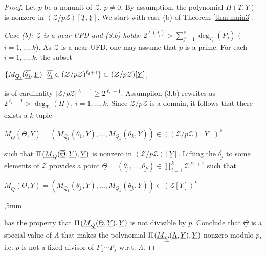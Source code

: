 \documentclass[10pt,a4paper]{amsart}
\begin{document}
\begin{proof} Let $p$ be a nonunit of ${\mathcal Z}$, $p\not=0$. By assumption, the polynomial $\Pi(\underline T,\underline Y)$ is nonzero in $({\mathcal Z}/p{\mathcal Z})[\underline T,\underline Y]$. We start with case (b) of Theorem \ref{thm:main3}.
\vskip 1mm

\noindent
\emph{Case {\rm (b)}: ${\mathcal Z}$ is a near UFD and {\rm (3.b)} holds: $2^{\ell({\underline d}_i)} > \sum_{j=1}^s \deg_{T_i}(P_j)$} ($i=1,\ldots,k$). As ${\mathcal Z}$ is a near UFD, one may assume that $p$ is a prime. For each $i=1,\ldots,k$, the subset
\vskip 2mm

\centerline{$\{M_{\underline {Q_i}}({\overline{\underline{\theta_i}}}, \underline Y) \hskip 2pt | \hskip 2pt \overline{\underline{\theta_i}} \in ({\mathcal Z}/p{\mathcal Z})^{\ell_i+1}\} \subset ({\mathcal Z}/p{\mathcal Z})[\underline Y]$,}
\vskip 2mm

\noindent
is of cardinality $|{\mathcal Z}/p{\mathcal Z}|^{\ell_i+1} \geq 2^{\ell_i+1}$. 
Assumpiion (3.b) rewrites as $2^{\ell_i+1}> \deg_{T_i}(\Pi)$, $i=1,\ldots,k$. Since ${\mathcal Z}/p{\mathcal Z}$ is a domain, it follows that there exists a $k$-tuple 
\vskip 1mm

\centerline{$\underline M_{\underline Q}( \overline{\underline{\Theta}},\underline Y)=(M_{\underline {Q_1}}({\overline{\underline{\theta_1}}}, \underline Y), \ldots, M_{\underline {Q_k}}({\overline{\underline{\theta_k}}}, \underline Y)) \in (({\mathcal Z}/p{\mathcal Z})[\underline Y])^k$}
\vskip 1mm

\noindent
such that
$\Pi\hskip 1pt (\underline M_{\underline Q}(\overline{\underline{\Theta}},\underline Y),\underline Y)$ is nonzero in $({\mathcal Z}/p{\mathcal Z})[\underline Y]$.
 Lifting the $\overline{\underline{\theta_i}}$ to some elements of ${\mathcal Z}$ provides a point ${\underline{\Theta}} = (\underline {\theta_1},\ldots,\underline{\theta_k})\in \prod_{i=1}^k {\mathcal Z}^{\ell_i+1}$ such that 
 \vskip 1mm
 
 \centerline{$\underline M_{\underline Q}( \underline{\Theta},\underline Y)=(M_{\underline {Q_1}}({\underline{\theta_1}}, \underline Y), \ldots, M_{\underline {Q_k}}(\underline{\theta_k}, \underline Y)) \in ({\mathcal Z}[\underline Y])^k$}
 
 ,5mm

 \noindent
  has the property that $\Pi\hskip 1pt (\underline M_{\underline Q}(\underline{\Theta},\underline Y),\underline Y)$ is not divisible by $p$.  
Conclude that $\underline{\Theta}$ is a special value of $\underline{\Lambda}$ that makes the polynomial $\Pi\hskip 1pt (\underline M_{\underline Q}(\underline{\Lambda},\underline Y),\underline Y)$ nonzero modulo $p$, \hbox{i.e.} $p$ is not a fixed divisor of $F_1\cdots F_s$ \hbox{w.r.t.} $\underline{\Lambda}$.
\vskip 2mm


\end{proof}
\end{document}
